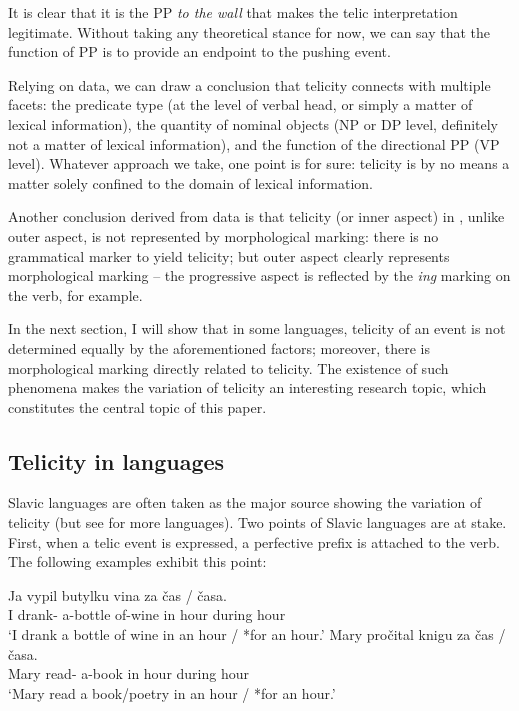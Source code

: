 \documentclass[output=paper]{langsci/langscibook}
\begin{document}
It is clear that it is the PP \emph{to the wall} that makes the telic
interpretation legitimate. Without taking any theoretical stance for now, we
can say that the function of PP is to provide an endpoint to the pushing event.

Relying on  data, we can draw a conclusion that telicity connects with
multiple facets: the predicate type (at the level of verbal head, or simply a
matter of lexical information), the quantity of nominal objects (NP or DP
level, definitely not a matter of lexical information), and the function of
the directional PP (VP level). Whatever approach we take, one point is for
sure: telicity is by no means a matter solely confined to the domain of lexical
information.

Another conclusion derived from  data is that telicity (or inner aspect)
in , unlike outer aspect, is not represented by morphological marking:
there is no grammatical marker to yield telicity; but outer aspect clearly
represents morphological marking -- the progressive aspect is reflected by the
\emph{ing} marking on the verb, for example.

In the next section, I will show that in some languages, telicity of an event
is not determined equally by the aforementioned factors; moreover, there is
morphological marking directly related to telicity. The existence of such
phenomena makes the variation of telicity an interesting research topic, which
constitutes the central topic of this paper.

\subsection{Telicity in  languages}\label{sub:17.2.2}

Slavic languages are often taken as the major source showing the variation of
telicity (but see \citealt{travis2010inner} for more languages). Two points of
Slavic languages are at stake. First, when a telic event is expressed, a
perfective prefix is attached to the verb. The following  examples
exhibit this point:\pagebreak

\begin{exe}
\ex {} \parencite[146]{MacDonald2008}\begin{xlist}
    \ex \gll Ja vypil butylku vina za čas {/ }  časa.\\
            I {drank-\Pfv{}} a-bottle of-wine in hour {} during hour \\
	    \glt \enquote*{I drank a bottle of wine in an hour / *for an hour.}
    \ex \gll  Mary pročital knigu za čas {/ }  časa.\\
            Mary {read-\Pfv{}} a-book in hour {} during hour\\
        \glt \enquote*{Mary read a book/poetry in an hour / *for an hour.}
\end{xlist}
\end{exe}
\end{document}
